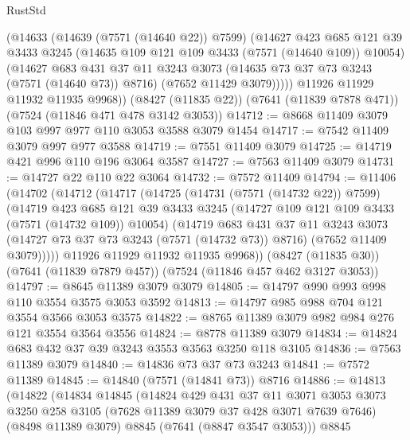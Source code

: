 \begin{lexlean}{RustStd}
\begin{coremodule}
{\begin{coremodule}
{{{{{{{{{{{{{{{{{{{{{{{{{{{{{{{{          (@14633
            (@14639 (@7571 (@14640 @22)) @7599)
            (@14627
              @423
              @685
              @121
              @39
              @3433
              @3245
              (@14635 @109 @121 @109 @3433 (@7571 (@14640 @109)) @10054)
              (@14627
                @683
                @431
                @37
                @11
                @3243
                @3073
                (@14635 @73 @37 @73 @3243 (@7571 (@14640 @73)) @8716)
                (@7652 @11429 @3079)))))
        @11926
        @11929
        @11932
        @11935
        @9968))
    (@8427 (@11835 @22))
    (@7641 (@11839 @7878 @471))
    (@7524 (@11846 @471 @478 @3142 @3053))
@14712 := @8668 @11409 @3079 @103 @997 @977 @110 @3053 @3588 @3079 @1454
@14717 := @7542 @11409 @3079 @997 @977 @3588
@14719 := @7551 @11409 @3079
@14725 := @14719 @421 @996 @110 @196 @3064 @3587
@14727 := @7563 @11409 @3079
@14731 := @14727 @22 @110 @22 @3064
@14732 := @7572 @11409
@14794 := @11406
    (@14702
      (@14712
        (@14717
          (@14725
            (@14731 (@7571 (@14732 @22)) @7599)
            (@14719
              @423
              @685
              @121
              @39
              @3433
              @3245
              (@14727 @109 @121 @109 @3433 (@7571 (@14732 @109)) @10054)
              (@14719
                @683
                @431
                @37
                @11
                @3243
                @3073
                (@14727 @73 @37 @73 @3243 (@7571 (@14732 @73)) @8716)
                (@7652 @11409 @3079)))))
        @11926
        @11929
        @11932
        @11935
        @9968))
    (@8427 (@11835 @30))
    (@7641 (@11839 @7879 @457))
    (@7524 (@11846 @457 @462 @3127 @3053))
@14797 := @8645 @11389 @3079 @3079
@14805 := @14797 @990 @993 @998 @110 @3554 @3575 @3053 @3592
@14813 := @14797 @985 @988 @704 @121 @3554 @3566 @3053 @3575
@14822 := @8765 @11389 @3079 @982 @984 @276 @121 @3554 @3564 @3556
@14824 := @8778 @11389 @3079
@14834 := @14824 @683 @432 @37 @39 @3243 @3553 @3563 @3250 @118 @3105
@14836 := @7563 @11389 @3079
@14840 := @14836 @73 @37 @73 @3243
@14841 := @7572 @11389
@14845 := @14840 (@7571 (@14841 @73)) @8716
@14886 := @14813
    (@14822
      (@14834
        @14845
        (@14824
          @429
          @431
          @37
          @11
          @3071
          @3053
          @3073
          @3250
          @258
          @3105
          (@7628 @11389 @3079 @37 @428 @3071 @7639 @7646)
          (@8498 @11389 @3079)
          @8845
          (@7641 (@8847 @3547 @3053)))
        @8845
}}}}}}}}}}}}}}}}}}}}}}}}}}}}}}}}
\end{coremodule}}
\end{coremodule}
\end{lexlean}
